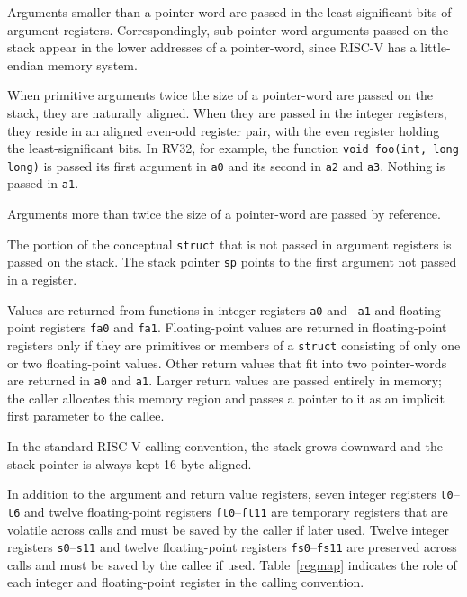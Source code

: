 Arguments smaller than a pointer-word are passed in the least-significant bits
of argument registers.  Correspondingly, sub-pointer-word arguments passed on
the stack appear in the lower addresses of a pointer-word, since RISC-V
has a little-endian memory system.

When primitive arguments twice the size of a pointer-word are passed on the
stack, they are naturally aligned.  When they are passed in the integer
registers, they reside in an aligned even-odd register pair, with the even
register holding the least-significant bits.  In RV32, for example, the function
{\tt void foo(int, long long)} is passed its first argument in
{\tt a0} and its second in {\tt a2} and {\tt a3}.  Nothing is passed
in {\tt a1}.

Arguments more than twice the size of a pointer-word are passed by reference.

The portion of the conceptual {\tt struct} that is not passed in argument
registers is passed on the stack.  The stack pointer {\tt sp} points to the
first argument not passed in a register.

Values are returned from functions in integer registers {\tt a0} and {\tt
a1} and floating-point registers {\tt fa0} and {\tt fa1}.  Floating-point
values are returned in floating-point registers only if they are primitives or
members of a {\tt struct} consisting of only one or two floating-point values.
Other return values that fit into two pointer-words are returned in {\tt a0}
and {\tt a1}.  Larger return values are passed entirely in memory; the caller
allocates this memory region and passes a pointer to it as an implicit first
parameter to the callee.

In the standard RISC-V calling convention, the stack grows downward and the
stack pointer is always kept 16-byte aligned.

In addition to the argument and return value registers,
seven integer registers {\tt t0}--{\tt t6} and twelve floating-point registers
{\tt ft0}--{\tt ft11} are temporary registers that are volatile across
calls and must be saved by the caller if later used.
Twelve integer registers {\tt s0}--{\tt s11} and twelve floating-point
registers {\tt fs0}--{\tt fs11} are preserved across calls and must be saved
by the callee if used.  Table~\ref{regmap} indicates the role of each
integer and floating-point register in the calling convention.

